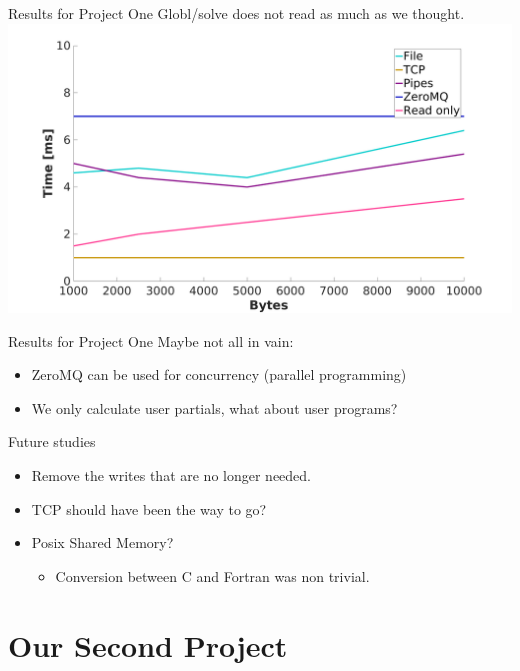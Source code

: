 \documentclass{beamer}
\begin{document}
    \begin{frame}{Results for Project One}
        Globl/solve does not read as much as we thought.
        \centering
        \includegraphics[width=1\columnwidth]{singlerun}
    \end{frame}
    \begin{frame}{Results for Project One}
        Maybe not all in vain:
        \pause
        \begin{itemize}[<+-|alert@+>]
            \item ZeroMQ can be used for concurrency (parallel programming)
            \item We only calculate user partials, what about user programs?
        \end{itemize}
    \end{frame}
    \begin{frame}{Future studies}
        \begin{itemize}[<+-|alert@+>]
            \item Remove the writes that are no longer needed.
            \item TCP should have been the way to go?
            \item Posix Shared Memory?
            \begin{itemize}[<+-|alert@+>]
                \item Conversion between C and Fortran was non trivial.
            \end{itemize}
        \end{itemize}
    \end{frame}


    \section{Our Second Project}
\end{document}
